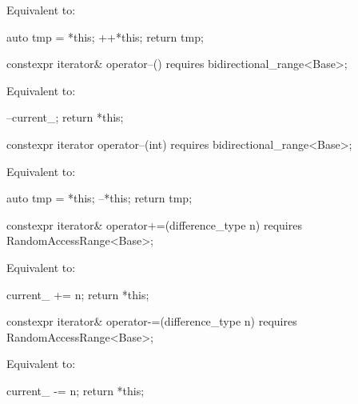 \begin{itemdescr}
\pnum
\effects Equivalent to:
\begin{codeblock}
auto tmp = *this;
++*this;
return tmp;
\end{codeblock}
\end{itemdescr}

\begin{itemdecl}
constexpr iterator& operator--() requires bidirectional_range<Base>;
\end{itemdecl}

\begin{itemdescr}
\pnum
\effects Equivalent to:
\begin{codeblock}
--current_;
return *this;
\end{codeblock}
\end{itemdescr}

\begin{itemdecl}
constexpr iterator operator--(int) requires bidirectional_range<Base>;
\end{itemdecl}

\begin{itemdescr}
\pnum
\effects Equivalent to:
\begin{codeblock}
auto tmp = *this;
--*this;
return tmp;
\end{codeblock}
\end{itemdescr}

\begin{itemdecl}
constexpr iterator& operator+=(difference_type n)
  requires RandomAccessRange<Base>;
\end{itemdecl}

\begin{itemdescr}
\pnum
\effects Equivalent to:
\begin{codeblock}
current_ += n;
return *this;
\end{codeblock}
\end{itemdescr}

%
\begin{itemdecl}
constexpr iterator& operator-=(difference_type n)
  requires RandomAccessRange<Base>;
\end{itemdecl}

\begin{itemdescr}
\pnum
\effects Equivalent to:
\begin{codeblock}
current_ -= n;
return *this;
\end{codeblock}
\end{itemdescr}

